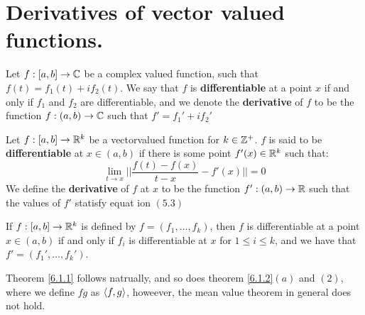 
\section{Derivatives of vector valued functions.}

\begin{definition}
    Let $f:[a,b] \rightarrow \mathbb{C}$ be a complex valued function, such that $f(t)=f_1(t)+if_2(t)$.
    We say that $f$ is \textbf{differentiable} at  a point $x$ if and only if  $f_1$ and $f_2$
    are differentiable, and we denote the \textbf{derivative} of $f$ to be the function
    $f:(a,b) \rightarrow \mathbb{C}$ such that  $f'=f_1'+if_2'$
\end{definition}

\begin{definition}
    Let $f:[a,b] \rightarrow \mathbb{R}^k$ be a vectorvalued function for  $k \in \mathbb{Z}^+$.  $f$ is said
    to be \textbf{differentiable} at $x \in (a,b)$ if there is some point $f'(x) \in \mathbb{R}^k$ such that:
        \begin{equation}
            \lim_{t \rightarrow x}{||\frac{f(t)-f(x)}{t-x}-f'(x)||}=0
        \end{equation}
        We define the \textbf{derivative} of  $f$ at $x$ to be the function $f':(a,b) \rightarrow \mathbb{R}$ such
        that the values of $f'$ statisfy equat ion $(5.3)$
\end{definition}

\begin{remark}
    If $f:[a,b] \rightarrow \mathbb{R}^k$ is defined by  $f=(f_1, \dots, f_k)$, then  $f$ is
    differentiable at a point  $x \in (a,b)$ if and only if $f_i$ is differentiable at  $x$
    for  $1 \leq i \leq k$, and we have that  $f'=(f_1', \dots, f_k')$.
\end{remark}

Theorem \ref{6.1.1} follows natrually, and so does theorem \ref{6.1.2}$(a)$ and $(2)$, where
we define  $fg$ as  $\langle f,g\rangle$, howeever, the mean value theorem in general does not hold.


